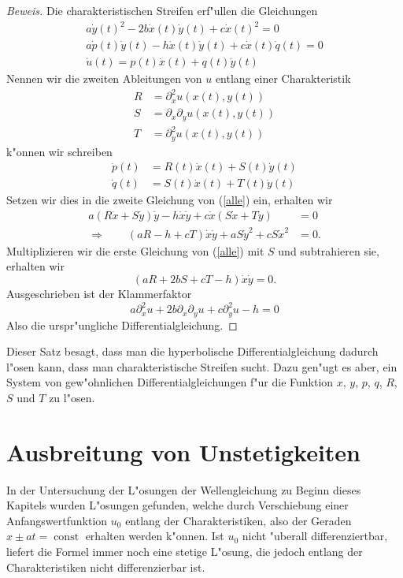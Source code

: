 \begin{proof}[Beweis]
Die charakteristischen Streifen erf"ullen die Gleichungen
\begin{equation}
\begin{gathered}
a\dot y(t)^2-2b\dot x(t)\dot y(t)+c\dot x(t)^2=0
\\
a\dot p(t)\dot y(t)-h\dot x(t)\dot y(t)+c\dot x(t)\dot q(t)=0
\\
\dot u(t)=p(t)\dot x(t)+q(t)\dot y(t)
\end{gathered}
\label{alle}
\end{equation}
Nennen wir die zweiten Ableitungen von $u$ entlang einer Charakteristik
\begin{align*}
R&=\partial_x^2u(x(t),y(t))
\\
S&=\partial_x\partial_yu(x(t),y(t))
\\
T&=\partial_y^2u(x(t),y(t))
\end{align*}
k"onnen wir schreiben
\begin{align*}
\dot p(t)&=R(t)\dot x(t)+S(t)\dot y(t)\\
\dot q(t)&=S(t)\dot x(t)+T(t)\dot y(t)
\end{align*}
Setzen wir dies in die zweite Gleichung von (\ref{alle}) ein, erhalten wir
\begin{align*}
a(R\dot x+S\dot y)\dot y-h\dot x\dot y+c\dot x(S\dot x+T\dot y)&=0
\\
\Rightarrow \qquad(aR-h+cT)\dot x\dot y+aS\dot y^2 +cS \dot x^2&=0.
\end{align*}
Multiplizieren wir die erste Gleichung von (\ref{alle}) mit $S$ und subtrahieren
sie, erhalten wir
\[
(aR+2bS+cT-h)\dot x\dot y=0.
\]
Ausgeschrieben ist der Klammerfaktor
\[
a\partial_x^2u+2b\partial_x\partial_yu+c\partial_y^2u-h=0
\]
Also die urspr"ungliche Differentialgleichung.
\end{proof}
Dieser Satz besagt, dass man die hyperbolische Differentialgleichung dadurch
l"osen kann, dass man charakteristische Streifen sucht. Dazu gen"ugt
es aber, ein System von gew"ohnlichen Differentialgleichungen
f"ur die Funktion $x$, $y$, $p$, $q$, $R$, $S$ und $T$
zu l"osen.

\section{Ausbreitung von Unstetigkeiten}
In der Untersuchung der L"osungen der Wellengleichung zu Beginn
dieses Kapitels wurden L"osungen gefunden, welche durch Verschiebung
einer Anfangswertfunktion $u_0$ entlang der 
Charakteristiken, also der Geraden 
$x\pm at=\operatorname{const}$ erhalten werden k"onnen. Ist $u_0$
nicht "uberall differenziertbar, liefert die Formel immer noch eine
stetige L"osung, die jedoch entlang der Charakteristiken nicht
differenzierbar ist.

